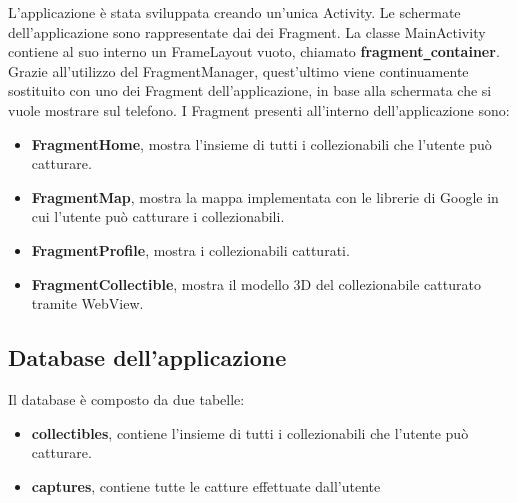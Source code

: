 \documentclass{article}
\begin{document}
L'applicazione è stata sviluppata creando un'unica Activity. Le schermate dell'applicazione sono rappresentate dai dei Fragment. La classe
MainActivity contiene al suo interno un FrameLayout vuoto, chiamato \textbf{fragment\texttt{\_}container}. Grazie all'utilizzo del FragmentManager, 
quest'ultimo viene continuamente sostituito con uno dei Fragment dell'applicazione, in base alla schermata che si vuole mostrare sul telefono.
I Fragment presenti all'interno dell'applicazione sono:
\begin{itemize}
    \itemsep 0em 
    \item \textbf{FragmentHome}, mostra l'insieme di tutti i collezionabili che l'utente può catturare.
    \item \textbf{FragmentMap}, mostra la mappa implementata con le librerie di Google in cui l'utente può catturare i collezionabili.
    \item \textbf{FragmentProfile}, mostra i collezionabili catturati.
    \item \textbf{FragmentCollectible}, mostra il modello 3D del collezionabile catturato tramite WebView.
\end{itemize}

\subsection{Database dell'applicazione}

Il database è composto da due tabelle: 
\begin{itemize}
    \itemsep 0em 
    \item \textbf{collectibles}, contiene l'insieme di tutti i collezionabili che l'utente può catturare. 
    \item \textbf{captures}, contiene tutte le catture effettuate dall'utente
\end{itemize}
\end{document}
